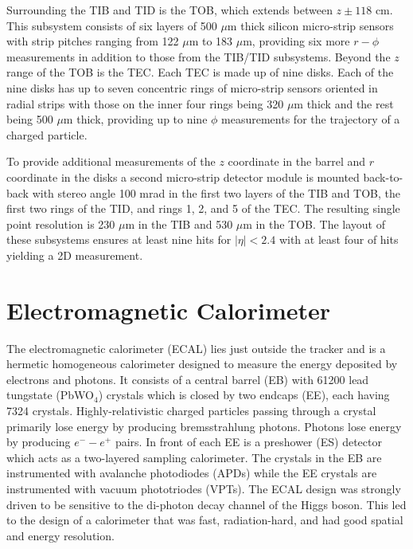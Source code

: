 Surrounding the TIB and TID is the TOB, which extends between $z \pm 118$ cm.  This subsystem consists of six layers of 500 $\mu$m thick silicon micro-strip sensors with strip pitches ranging from 122 $\mu$m to 183 $\mu$m, providing six more $r-\phi$ measurements in addition to those from the TIB/TID subsystems. Beyond the $z$ range of the TOB is the TEC.  Each TEC is made up of nine disks.  Each of the nine disks has up to seven concentric rings of micro-strip sensors oriented in radial strips with those on the inner four rings being 320 $\mu$m thick and the rest being 500 $\mu$m thick, providing up to nine $\phi$ measurements for the trajectory of a charged particle.  

To provide additional measurements of the $z$ coordinate in the barrel and $r$ coordinate in the disks a second micro-strip detector module is mounted back-to-back with stereo angle 100 mrad in the first two layers of the TIB and TOB, the first two rings of the TID, and rings 1, 2, and 5 of the TEC.  The resulting single point resolution is 230 $\mu$m in the TIB and 530 $\mu$m in the TOB.  The layout of these subsystems ensures at least nine hits for $|\eta| < 2.4$ with at least four of hits yielding a 2D measurement.



\section{Electromagnetic Calorimeter}

The electromagnetic calorimeter (ECAL) lies just outside the tracker and is a hermetic homogeneous calorimeter designed to measure the energy deposited by electrons and photons.  It consists of a central barrel (EB) with 61200 lead tungstate (PbWO$_{4}$) crystals which is closed by two endcaps (EE), each having 7324 crystals.  Highly-relativistic charged particles passing through a crystal primarily lose energy by producing bremsstrahlung photons.  Photons lose energy by producing $e^{-}-e^{+}$ pairs.  In front of each EE is a preshower (ES) detector which acts as a two-layered sampling calorimeter.  The crystals in the EB are instrumented with avalanche photodiodes (APDs) while the EE crystals are instrumented with vacuum phototriodes (VPTs). The ECAL design was strongly driven to be sensitive to the di-photon decay channel of the Higgs boson.  This led to the design of a calorimeter that was fast, radiation-hard, and had good spatial and energy resolution.  





